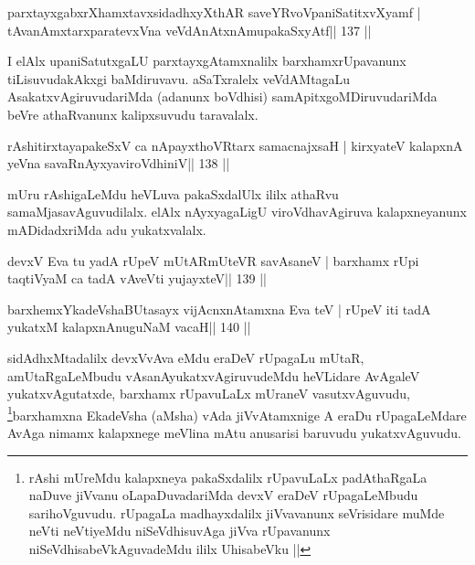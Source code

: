 
\begin{shl}
parxtayxgabxrXhamxtavxsidadhxyXthAR saveYRvoVpaniSatitxvXyamf |
tAvanAmxtarxparatevxVna veVdAnAtxnAmupakaSxyAtf\hfill || 137 ||
\end{shl}

\begin{artha}
I elAlx upaniSatutxgaLU parxtayxgAtamxnalilx barxhamxrUpavanunx tiLisuvudakAkxgi baMdiruvavu. aSaTxralelx veVdAMtagaLu AsakatxvAgiruvudariMda (adanunx boVdhisi) samApitxgoMDiruvudariMda beVre athaRvanunx kalipxsuvudu taravalalx.
\end{artha}


\begin{shl}
rAshitirxtayapakeSxV ca nApayxthoVR\s tarx samacnajxsaH |
kirxyateV kalapxnA yeVna savaRnAyxyaviroVdhiniV\hfill || 138 ||
\end{shl}

\begin{artha}
mUru rAshigaLeMdu heVLuva pakaSxdalUlx ililx athaRvu samaMjasavAguvudilalx. elAlx nAyxyagaLigU viroVdhavAgiruva kalapxneyanunx mADidadxriMda adu yukatxvalalx.
\end{artha}


\begin{shl}
devxV Eva tu yadA rUpeV mUtARmUteVR savAsaneV |
barxhamx rUpi taqtiVyaM ca tadA vAveVti yujayxteV\hfill || 139 ||
\end{shl}

\begin{shl}
barxhemxYkadeVshaBUtasayx vijAcnxnAtamxna Eva teV |
rUpeV iti tadA yukatxM kalapxnAnuguNaM vacaH\hfill || 140 ||
\end{shl}

\begin{artha}
sidAdhxMtadalilx devxVvAva eMdu eraDeV rUpagaLu  mUtaR, amUtaRgaLeMbudu
vAsanAyukatxvAgiruvudeMdu heVLidare AvAgaleV yukatxvAgutatxde, barxhamx
rUpavuLaLx mUraneV vasutxvAguvudu, \footnote{rAshi mUreMdu
  kalapxneya pakaSxdalilx rUpavuLaLx padAthaRgaLa naDuve jiVvanu
  oLapaDuvadariMda devxV eraDeV rUpagaLeMbudu sarihoVguvudu. rUpagaLa
  madhayxdalilx jiVvavanunx seVrisidare muMde neVti neVtiyeMdu
  niSeVdhisuvAga jiVva rUpavanunx niSeVdhisabeVkAguvadeMdu ililx
  UhisabeVku ||}barxhamxna EkadeVsha
(aMsha) vAda jiVvAtamxnige A eraDu rUpagaLeMdare AvAga nimamx
kalapxnege meVlina mAtu anusarisi baruvudu yukatxvAguvudu.
\end{artha}

